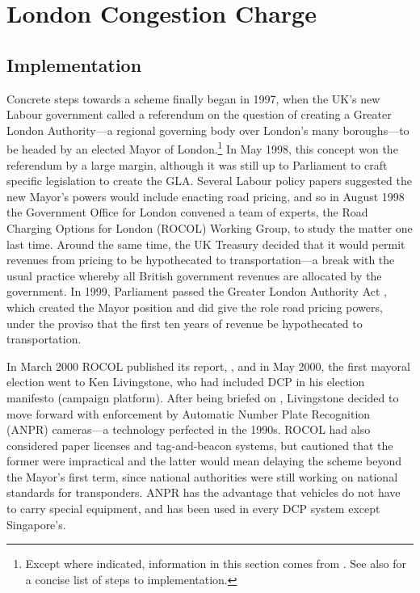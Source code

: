 \section{London Congestion Charge}\label{sec:london}

\subsection{Implementation}

Concrete steps towards a scheme finally began in 1997, when the UK's new Labour government called a referendum on the question of creating a Greater London Authority---a regional governing body over London's many boroughs---to be headed by an elected Mayor of London.\footnote{Except where indicated, information in this section comes from \citet[Ch. 6]{Richards2006}. See also \citet[Sec. 7.2]{TfLFifth2007} for a concise list of steps to implementation.} In May 1998, this concept won the referendum by a large margin, although it was still up to Parliament to craft specific legislation to create the GLA. Several Labour policy papers suggested the new Mayor's powers would include enacting road pricing, and so in August 1998 the Government Office for London convened a team of experts, the Road Charging Options for London (ROCOL) Working Group, to study the matter one last time. Around the same time, the UK Treasury decided that it would permit revenues from pricing to be hypothecated to transportation---a break with the usual practice whereby all British government revenues are allocated by the government. In 1999, Parliament passed the Greater London Authority Act \citep{Parliament1999}, which created the Mayor position and did give the role road pricing powers, under the proviso that the first ten years of revenue be hypothecated to transportation. 

In March 2000 ROCOL published its report, \citet{ROCOL2000}, and in May 2000, the first mayoral election went to Ken Livingstone, who had included DCP in his election manifesto (campaign platform). After being briefed on \citet{ROCOL2000}, Livingstone decided to move forward with enforcement by Automatic Number Plate Recognition (ANPR) cameras---a technology perfected in the 1990s. ROCOL had also considered paper licenses and tag-and-beacon systems, but cautioned that the former were impractical and the latter would mean delaying the scheme beyond the Mayor's first term, since national authorities were still working on national standards for transponders. ANPR has the advantage that vehicles do not have to carry special equipment, and has been used in every DCP system except Singapore's.

